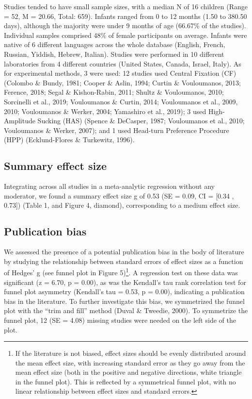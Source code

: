 \documentclass[man,floatsintext]{apa6}
\let\rmarkdownfootnote\footnote%
\def\footnote{\protect\rmarkdownfootnote}
\begin{document}
Studies tended to have small sample sizes, with a median N of 16 children (Range = 52, M = 20.66, Total: 659).
Infants ranged from 0 to 12 months (1.50 to 380.50 days), although the majority were under 9 months of age (66.67\% of the studies). Individual samples comprised 48\% of female participants on average. Infants were native of 6 different languages across the whole database (English, French, Russian, Yiddish, Hebrew, Italian).
Studies were performed in 10 different laboratories from 4 different countries (United States, Canada, Israel, Italy). As for experimental methods, 3 were used: 12 studies used Central Fixation (CF) (Colombo \& Bundy, 1981; Cooper \& Aslin, 1994; Curtin \& Vouloumanos, 2013; Ference, 2018; Segal \& Kishon-Rabin, 2011; Shultz \& Vouloumanos, 2010; Sorcinelli et al., 2019; Vouloumanos \& Curtin, 2014; Vouloumanos et al., 2009, 2010; Vouloumanos \& Werker, 2004; Yamashiro et al., 2019); 3 used High-Amplitude Sucking (HAS) (Spence \& DeCasper, 1987; Vouloumanos et al., 2010; Vouloumanos \& Werker, 2007); and 1 used Head-turn Preference Procedure (HPP) (Ecklund-Flores \& Turkewitz, 1996).

\hypertarget{summary-effect-size}{%
\subsection{Summary effect size}\label{summary-effect-size}}

Integrating across all studies in a meta-analytic regression without any moderator, we found a summary effect size g of 0.53 (SE = 0.09, CI = {[}0.34 , 0.73{]}) (Table 1, and Figure 4, diamond), corresponding to a medium effect size.

\hypertarget{publication-bias}{%
\subsection{Publication bias}\label{publication-bias}}

We assessed the presence of a potential publication bias in the body of literature by studying the relationship between standard errors of effect sizes as a function of Hedges' g (see funnel plot in Figure 5)\footnote{If the literature is not biased, effect sizes should be evenly distributed around the mean effect size, with increasing standard error as they go away from the mean effect size (both in the positive and negative directions, white triangle in the funnel plot). This is reflected by a symmetrical funnel plot, with no linear relationship between effect sizes and standard errors.}. A regression test on these data was significant (z = 6.70, p = 0.00), as was the Kendall's tau rank correlation test for funnel plot asymmetry (Kendall's tau = 0.53, p = 0.00), indicating a publication bias in the literature.
To further investigate this bias, we symmetrized the funnel plot with the \enquote{trim and fill} method (Duval \& Tweedie, 2000). To symmetrize the funnel plot, 12 (SE = 4.08) missing studies were needed on the left side of the plot.
\end{document}
